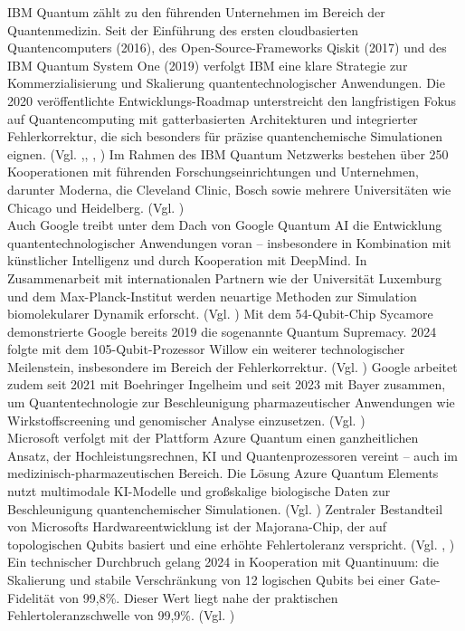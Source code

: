 IBM Quantum zählt zu den führenden Unternehmen im Bereich der Quantenmedizin. Seit der Einführung des ersten cloudbasierten Quantencomputers (2016), des Open-Source-Frameworks Qiskit (2017) und des IBM Quantum System One (2019) verfolgt IBM eine klare Strategie zur Kommerzialisierung und Skalierung quantentechnologischer Anwendungen. Die 2020 veröffentlichte Entwicklungs-Roadmap unterstreicht den langfristigen Fokus auf Quantencomputing mit gatterbasierten Architekturen und integrierter Fehlerkorrektur, die sich besonders für präzise quantenchemische Simulationen eignen. (Vgl. \cite{abughanemIBMQuantumComputers2025},\cite{jaygambettaIBMRoadmapQuantumcentric2022}, \cite{bravyiHighthresholdLowoverheadFaulttolerant2024}, \cite{mullerImprovedBeliefPropagation2025}) Im Rahmen des IBM Quantum Netzwerks bestehen über 250 Kooperationen mit führenden Forschungseinrichtungen und Unternehmen, darunter Moderna, die Cleveland Clinic, Bosch sowie mehrere Universitäten wie Chicago und Heidelberg. (Vgl. \cite{noauthor_ibm_nodate})\\

Auch Google treibt unter dem Dach von Google Quantum AI die Entwicklung quantentechnologischer Anwendungen voran – insbesondere in Kombination mit künstlicher Intelligenz und durch Kooperation mit DeepMind. In Zusammenarbeit mit internationalen Partnern wie der Universität Luxemburg und dem Max-Planck-Institut werden neuartige Methoden zur Simulation biomolekularer Dynamik erforscht. (Vgl. \cite{unkeBiomolecularDynamicsMachinelearned2024}) Mit dem 54-Qubit-Chip Sycamore demonstrierte Google bereits 2019 die sogenannte Quantum Supremacy. 2024 folgte mit dem 105-Qubit-Prozessor Willow ein weiterer technologischer Meilenstein, insbesondere im Bereich der Fehlerkorrektur. (Vgl. \cite{arute_quantum_2019, acharya_quantum_2025}) Google arbeitet zudem seit 2021 mit Boehringer Ingelheim und seit 2023 mit Bayer zusammen, um Quantentechnologie zur Beschleunigung pharmazeutischer Anwendungen wie Wirkstoffscreening und genomischer Analyse einzusetzen. (Vgl. \cite{ingelheimCooperationGoogleQuantum2021, BayerAccelerateDrug})\\

Microsoft verfolgt mit der Plattform Azure Quantum einen ganzheitlichen Ansatz, der Hochleistungsrechnen, KI und Quantenprozessoren vereint – auch im medizinisch-pharmazeutischen Bereich. Die Lösung Azure Quantum Elements nutzt multimodale KI-Modelle und großskalige biologische Daten zur Beschleunigung quantenchemischer Simulationen. (Vgl. \cite{buntzMicrosoftEyesQuantum2023}) Zentraler Bestandteil von Microsofts Hardwareentwicklung ist der Majorana-Chip, der auf topologischen Qubits basiert und eine erhöhte Fehlertoleranz verspricht. (Vgl. \cite{aasenRoadmapFaultTolerant2025}, \cite{aghaeeInterferometricSingleshotParity2025}) Ein technischer Durchbruch gelang 2024 in Kooperation mit Quantinuum: die Skalierung und stabile Verschränkung von 12 logischen Qubits bei einer Gate-Fidelität von 99,8\%. Dieser Wert liegt nahe der praktischen Fehlertoleranzschwelle von 99,9\%. (Vgl. \cite{reichardtDemonstrationQuantumComputation2024})\\

